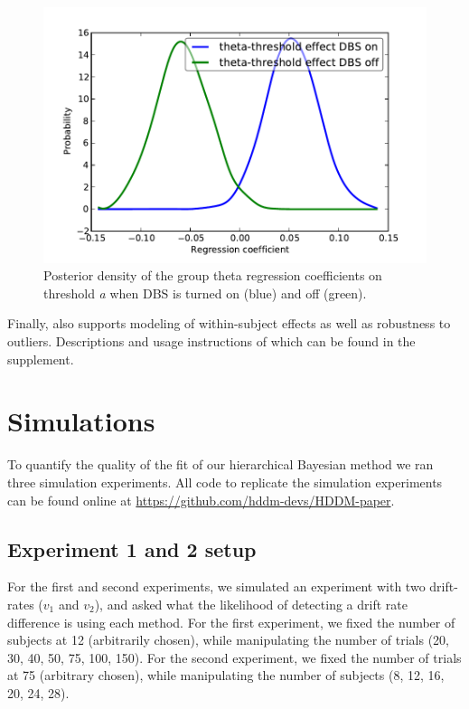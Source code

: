 \documentclass[letterpaper,10pt,english]{article}
\begin{document}
\begin{figure}
\includegraphics[scale=0.6]{theta_threshold_on_off.pdf}
\caption{Posterior density of the group theta regression coefficients
on threshold \emph{a} when DBS is turned on (blue) and off (green).}
\label{fig.post_theta}
\end{figure}

Finally,  also supports modeling of within-subject effects
as well as robustness to outliers. Descriptions and usage instructions
of which can be found in the supplement.

\section*{Simulations}

To quantify the quality of the fit of our hierarchical Bayesian method
we ran three simulation experiments. All code to replicate the simulation experiments can be found online at \href{https://github.com/hddm-devs/HDDM-paper}{https://github.com/hddm-devs/HDDM-paper}.

\subsection*{Experiment 1 and 2 setup}
For the first and second experiments, we simulated an experiment with
two drift-rates ($v_{\text{1}}$ and $v_{\text{2}}$), and asked what
the likelihood of detecting a drift rate difference is using each
method. For the first experiment, we fixed the number of subjects at
12 (arbitrarily chosen), while manipulating the number of trials (20,
30, 40, 50, 75, 100, 150).  For the second experiment, we fixed the
number of trials at 75  (arbitrary chosen), while manipulating the
number of subjects (8, 12, 16, 20, 24, 28).
\end{document}
